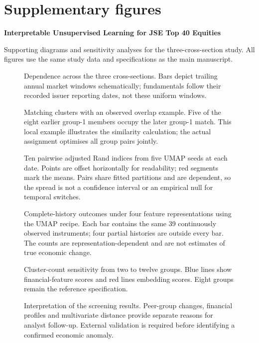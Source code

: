 

\renewcommand{\thefigure}{S\arabic{figure}}
\renewcommand{\figurename}{Supplementary Figure}
\renewcommand{\thepage}{S\arabic{page}}
\section*{Supplementary figures}
\textbf{Interpretable Unsupervised Learning for JSE Top 40 Equities}

Supporting diagrams and sensitivity analyses for the three-cross-section study. All figures use the same study data and specifications as the main manuscript.

\begin{figure}[htbp]
\centering
{}
\caption{Dependence across the three cross-sections. Bars depict trailing annual market windows schematically; fundamentals follow their recorded issuer reporting dates, not these uniform windows.}\label{fig:windows}
\end{figure}
\clearpage
\begin{figure}[htbp]
\centering
{}
\caption{Matching clusters with an observed overlap example. Five of the eight earlier group-1 members occupy the later group-1 match. This local example illustrates the similarity calculation; the actual assignment optimises all group pairs jointly.}\label{fig:alignment}
\end{figure}
\clearpage
\begin{figure}[htbp]
\centering
{}
\caption{Ten pairwise adjusted Rand indices from five UMAP seeds at each date. Points are offset horizontally for readability; red segments mark the means. Pairs share fitted partitions and are dependent, so the spread is not a confidence interval or an empirical null for temporal switches.}\label{fig:seed_variability}
\end{figure}
\clearpage
\begin{figure}[htbp]
\centering
{}
\caption{Complete-history outcomes under four feature representations using the UMAP recipe. Each bar contains the same 39 continuously observed instruments; four partial histories are outside every bar. The counts are representation-dependent and are not estimates of true economic change.}\label{fig:feature_sensitivity}
\end{figure}
\clearpage
\begin{figure}[htbp]
\centering
{}
\caption{Cluster-count sensitivity from two to twelve groups. Blue lines show financial-feature scores and red lines embedding scores. Eight groups remain the reference specification.}\label{fig:cluster_count}
\end{figure}
\clearpage
\begin{figure}[htbp]
\centering
{}
\caption{Interpretation of the screening results. Peer-group changes, financial profiles and multivariate distance provide separate reasons for analyst follow-up. External validation is required before identifying a confirmed economic anomaly.}\label{fig:evidence}
\end{figure}

